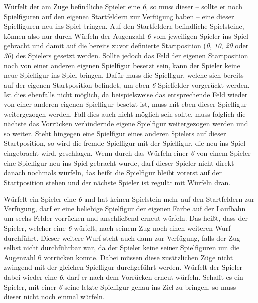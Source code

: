 \documentclass[
  name=\assignment,
  start=\releasedate,
  end=\duedate,
  subject=\lecture\,--\,\semester,
  group=\group,
  url=\theurl,
  author=\authors,
  mail=\themail
]{assignment}
\begin{document}
Würfelt der am Zuge befindliche Spieler eine \emph{6}, so muss dieser -- sollte er noch Spielfiguren auf den eigenen Startfeldern zur Verfügung haben -- eine dieser Spielfiguren neu ins Spiel bringen. Auf den Startfeldern befindliche Spielsteine, können also nur durch Würfeln der Augenzahl \emph{6} vom jeweiligen Spieler ins Spiel gebracht und damit auf die bereits zuvor definierte Startposition (\emph{0}, \emph{10}, \emph{20} oder \emph{30}) des Spielers gesetzt werden. Sollte jedoch das Feld der eigenen Startposition noch von einer anderen eigenen Spielfigur besetzt sein, kann der Spieler keine neue Spielfigur ins Spiel bringen. Dafür muss die Spielfigur, welche sich bereits auf der eigenen Startposition befindet, um eben \emph{6} Spielfelder vorgerückt werden. Ist dies ebenfalls nicht möglich, da beispielsweise das entsprechende Feld wieder von einer anderen eigenen Spielfigur besetzt ist, muss mit eben dieser Spielfigur weitergezogen werden. Fall dies auch nicht möglich sein sollte, muss folglich die nächste das Vorrücken verhindernde eigene Spielfigur weitergezogen werden und so weiter. Steht hingegen eine Spielfigur eines anderen Spielers auf dieser Startposition, so wird die fremde Spielfigur mit der Spielfigur, die neu ins Spiel eingebracht wird, geschlagen. Wenn durch das Würfeln einer \emph{6} von einem Spieler eine Spielfigur neu ins Spiel gebracht wurde, darf dieser Spieler nicht direkt danach nochmals würfeln, das heißt die Spielfigur bleibt vorerst auf der Startposition stehen und der nächste Spieler ist regulär mit Würfeln dran.

Würfelt ein Spieler eine \emph{6} und hat keinen Spielstein mehr auf den Startfeldern zur Verfügung, darf er eine beliebige Spielfigur der eigenen Farbe auf der Laufbahn um sechs Felder vorrücken und anschließend erneut würfeln. Das heißt, dass der Spieler, welcher eine \emph{6} würfelt, nach seinem Zug noch einen weiteren Wurf durchführt. Dieser weitere Wurf steht auch dann zur Verfügung, falls der Zug selbst nicht durchführbar war, da der Spieler keine seiner Spielfiguren um die Augenzahl 6 vorrücken konnte. Dabei müssen diese zusätzlichen Züge nicht zwingend mit der gleichen Spielfigur durchgeführt werden. Würfelt der Spieler dabei wieder eine \emph{6}, darf er nach dem Vorrücken erneut würfeln. Schafft es ein Spieler, mit einer \emph{6} seine letzte Spielfigur genau ins Ziel zu bringen, so muss dieser nicht noch einmal würfeln.
\end{document}
